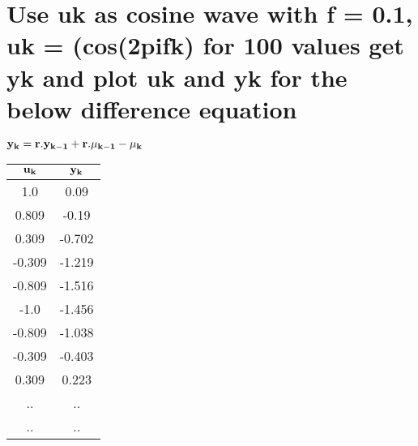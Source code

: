 \documentclass[a4paper,10pt]{article}
\begin{document}
\pagebreak
  \section{Use uk as cosine wave with f = 0.1, uk = (cos(2pifk) for 100 values get yk and  plot uk and yk for the below difference equation}
    $\bf{y_k = r.y_{k-1} + r.\mu_{k-1} - \mu_k}$
    
\begin{center}
\begin{tabular}[!hbt]{| c | c |}
\hline
  $\bf{u_k}$ & $\bf{y_k}$ \\
  \hline
 1.0 & 0.09\\ 
 0.809 & -0.19\\  
 0.309 & -0.702 \\
 -0.309 & -1.219 \\
 -0.809 & -1.516 \\
 -1.0 & -1.456 \\
 -0.809 & -1.038 \\
 -0.309 & -0.403 \\
 0.309 & 0.223 \\
 .. & .. \\
 .. & .. \\
 \hline
\end{tabular}
\end{center}
\end{document}
